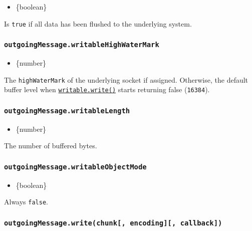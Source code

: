 \begin{itemize}
\tightlist
\item
  \{boolean\}
\end{itemize}

Is \texttt{true} if all data has been flushed to the underlying system.

\subsubsection{\texorpdfstring{\texttt{outgoingMessage.writableHighWaterMark}}{outgoingMessage.writableHighWaterMark}}\label{outgoingmessage.writablehighwatermark}

\begin{itemize}
\tightlist
\item
  \{number\}
\end{itemize}

The \texttt{highWaterMark} of the underlying socket if assigned.
Otherwise, the default buffer level when
\href{stream.md\#writablewritechunk-encoding-callback}{\texttt{writable.write()}}
starts returning false (\texttt{16384}).

\subsubsection{\texorpdfstring{\texttt{outgoingMessage.writableLength}}{outgoingMessage.writableLength}}\label{outgoingmessage.writablelength}

\begin{itemize}
\tightlist
\item
  \{number\}
\end{itemize}

The number of buffered bytes.

\subsubsection{\texorpdfstring{\texttt{outgoingMessage.writableObjectMode}}{outgoingMessage.writableObjectMode}}\label{outgoingmessage.writableobjectmode}

\begin{itemize}
\tightlist
\item
  \{boolean\}
\end{itemize}

Always \texttt{false}.

\subsubsection{\texorpdfstring{\texttt{outgoingMessage.write(chunk{[},\ encoding{]}{[},\ callback{]})}}{outgoingMessage.write(chunk{[}, encoding{]}{[}, callback{]})}}\label{outgoingmessage.writechunk-encoding-callback}

